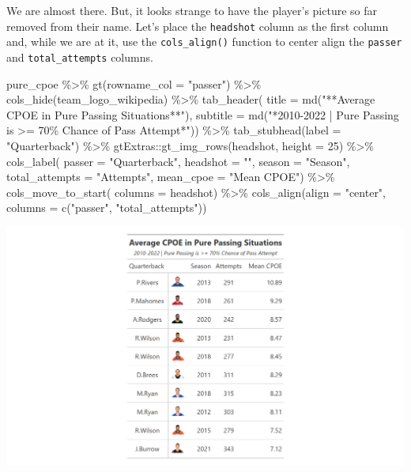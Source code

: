 \documentclass[
  letterpaper,
]{krantz}
\newenvironment{Shaded}{\begin{snugshade}}{\end{snugshade}}
\newcommand{\AttributeTok}[1]{\textcolor[rgb]{0.40,0.45,0.13}{#1}}
\newcommand{\DecValTok}[1]{\textcolor[rgb]{0.68,0.00,0.00}{#1}}
\newcommand{\FunctionTok}[1]{\textcolor[rgb]{0.28,0.35,0.67}{#1}}
\newcommand{\NormalTok}[1]{\textcolor[rgb]{0.00,0.23,0.31}{#1}}
\newcommand{\SpecialCharTok}[1]{\textcolor[rgb]{0.37,0.37,0.37}{#1}}
\newcommand{\StringTok}[1]{\textcolor[rgb]{0.13,0.47,0.30}{#1}}
\begin{document}
We are almost there. But, it looks strange to have the player's picture
so far removed from their name. Let's place the \texttt{headshot} column
as the first column and, while we are at it, use the
\texttt{cols\_align()} function to center align the \texttt{passer} and
\texttt{total\_attempts} columns.

\begin{Shaded}
\begin{Highlighting}[]
\NormalTok{pure\_cpoe }\SpecialCharTok{\%\textgreater{}\%}
  \FunctionTok{gt}\NormalTok{(}\AttributeTok{rowname\_col =} \StringTok{"passer"}\NormalTok{) }\SpecialCharTok{\%\textgreater{}\%}
  \FunctionTok{cols\_hide}\NormalTok{(team\_logo\_wikipedia) }\SpecialCharTok{\%\textgreater{}\%}
  \FunctionTok{tab\_header}\NormalTok{(}
    \AttributeTok{title =} \FunctionTok{md}\NormalTok{(}\StringTok{"**Average CPOE in Pure Passing Situations**"}\NormalTok{),}
    \AttributeTok{subtitle =} \FunctionTok{md}\NormalTok{(}\StringTok{"*2010{-}2022  |  Pure Passing is \textgreater{}= 70\%}
\StringTok{                  Chance of Pass Attempt*"}\NormalTok{)) }\SpecialCharTok{\%\textgreater{}\%}
  \FunctionTok{tab\_stubhead}\NormalTok{(}\AttributeTok{label =} \StringTok{"Quarterback"}\NormalTok{) }\SpecialCharTok{\%\textgreater{}\%}
\NormalTok{  gtExtras}\SpecialCharTok{::}\FunctionTok{gt\_img\_rows}\NormalTok{(headshot, }\AttributeTok{height =} \DecValTok{25}\NormalTok{) }\SpecialCharTok{\%\textgreater{}\%}
  \FunctionTok{cols\_label}\NormalTok{(}
    \AttributeTok{passer =} \StringTok{"Quarterback"}\NormalTok{,}
    \AttributeTok{headshot =} \StringTok{""}\NormalTok{,}
    \AttributeTok{season =} \StringTok{"Season"}\NormalTok{,}
    \AttributeTok{total\_attempts =} \StringTok{"Attempts"}\NormalTok{,}
    \AttributeTok{mean\_cpoe =} \StringTok{"Mean CPOE"}\NormalTok{) }\SpecialCharTok{\%\textgreater{}\%}
  \FunctionTok{cols\_move\_to\_start}\NormalTok{(}
    \AttributeTok{columns =}\NormalTok{ headshot) }\SpecialCharTok{\%\textgreater{}\%}
  \FunctionTok{cols\_align}\NormalTok{(}\AttributeTok{align =} \StringTok{"center"}\NormalTok{, }\AttributeTok{columns =} \FunctionTok{c}\NormalTok{(}\StringTok{"passer"}\NormalTok{, }\StringTok{"total\_attempts"}\NormalTok{))}
\end{Highlighting}
\end{Shaded}

\includegraphics[width=6.61in,height=\textheight]{images/gt_table_3.png}
\end{document}
